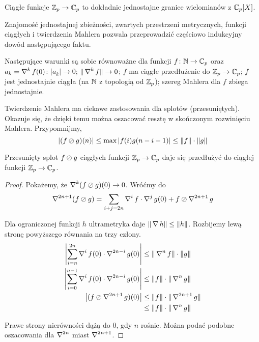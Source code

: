 \begin{wniosek}
	Ciągłe funkcje $\mathbb Z_p \to \mathbb C_p$ to dokładnie jednostajne granice wielomianów z $\mathbb C_p[X]$.
\end{wniosek}

Znajomość jednostajnej zbieżności, zwartych przestrzeni metrycznych, funkcji ciągłych i twierdzenia Mahlera pozwala przeprowadzić częściowo indukcyjny dowód następującego faktu.

\begin{fakt}
	Następujące warunki są sobie równoważne dla funkcji $f \colon \mathbb N \to \mathbb C_p$ oraz $a_k = \operatorname{\nabla}^k f(0)$:
	$|a_k| \to 0$;
	$\|\operatorname{\nabla}^kf\| \to 0$;
	$f$ ma ciągłe przedłużenie do $\mathbb Z_p \to \mathbb C_p$;
	$f$ jest jednostajnie ciągła (na $\mathbb N$ z topologią od $\mathbb Z_p$);
	szereg Mahlera dla $f$ zbiega jednostajnie. %
\end{fakt}

Twierdzenie Mahlera ma ciekawe zastosowania dla splotów (przesuniętych).
Okazuje się, że dzięki temu można oszacować resztę w skończonym rozwinięciu Mahlera.
Przypomnijmy,
\[
	|(f \oslash g)(n)| \le \max |f(i) g(n-i-1)| \le \|f\| \cdot \|g\|
\]

\begin{fakt}
	Przesunięty splot $f \oslash g$ ciągłych funkcji $\mathbb Z_p \to \mathbb C_p$ daje się przedłużyć do ciągłej funkcji $\mathbb Z_p \to \mathbb C_p$.
\end{fakt}

\begin{proof}
Pokażemy, że $\operatorname{\nabla}^k (f \oslash g)(0) \to 0$.
Wróćmy do 
\[
	\operatorname{\nabla}^{2n+1} (f \oslash g) = \sum_{i + j = 2n} \operatorname{\nabla}^i f \cdot \operatorname{\nabla}^j g(0) + f \oslash \operatorname{\nabla}^{2n+1} g
\]

Dla ograniczonej funkcji $h$ ultrametryka daje $\|\operatorname{\nabla} h\| \le \|h\|$.
Rozbijemy lewą stronę powyższego równania na trzy człony.
\begin{align*}
\left|\sum_{i = n}^{2n} \operatorname{\nabla}^i f (0) \cdot \operatorname{\nabla}^{2n-i} g(0) \right| & \le \|\operatorname{\nabla}^n f\| \cdot \|g\| \\
\left|\sum_{i = 0}^{n-1} \operatorname{\nabla}^i f(0) \cdot \operatorname{\nabla}^{2n - i} g(0) \right| & \le \|f\| \cdot \|\operatorname{\nabla}^n g\| \\
\left|(f \oslash \operatorname{\nabla}^{2n+1}g)(0)\right| & \le \|f\| \cdot \|\operatorname{\nabla}^{2n+1} g\| \\
& \le \|f\| \cdot \|\operatorname{\nabla}^n g\|
\end{align*}

Prawe strony nierówności dążą do $0$, gdy $n$ rośnie.
Można podać podobne oszacowania dla $\operatorname{\nabla}^{2n}$ miast $\operatorname{\nabla}^{2n+1}$.
\end{proof}

